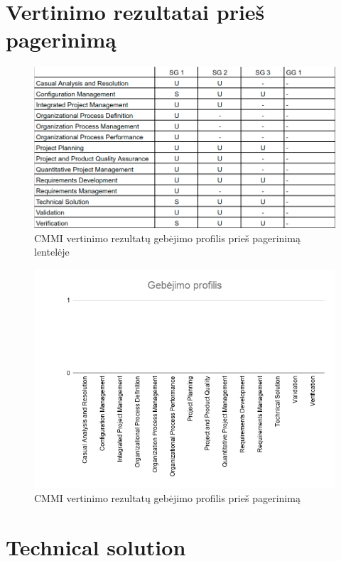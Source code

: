 \documentclass{VUMIFPSkursinis}
\begin{document}
	\section{Vertinimo rezultatai prieš pagerinimą}
	\begin{figure}[!htbp]
		\includegraphics[scale=0.55]{img/profilisPriesLentele}
		\caption{CMMI vertinimo rezultatų gebėjimo profilis prieš pagerinimą lentelėje} %
		\label{img:ProfilisPries}
	\end{figure}
	\begin{figure}[!htbp]
		\includegraphics[scale=0.8]{img/ProfilisPries}
		\caption{CMMI vertinimo rezultatų gebėjimo profilis prieš pagerinimą} %
		\label{img:ProfilisPries}
	\end{figure}
	
	
	\section{Technical solution}
	
\end{document}
